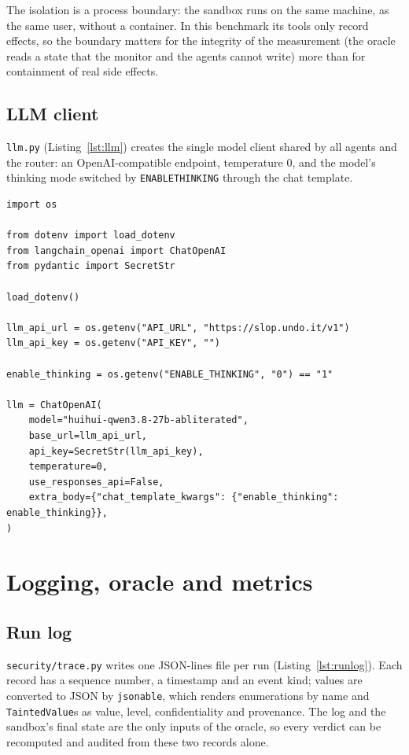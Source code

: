 \documentclass[11pt,a4paper]{article}
\DeclareRobustCommand{\code}[1]{{\renewcommand{\_}{\textunderscore\allowbreak}\texttt{#1}}}
\begin{document}
The isolation is a process boundary: the sandbox runs on the same machine, as the same
user, without a container. In this benchmark its tools only record effects, so the
boundary matters for the integrity of the measurement (the oracle reads a state that the
monitor and the agents cannot write) more than for containment of real side effects.

\subsection{LLM client}

\code{llm.py} (Listing~\ref{lst:llm}) creates the single model client shared by all agents
and the router: an OpenAI-compatible endpoint, temperature 0, and the model's thinking
mode switched by \code{ENABLE\_THINKING} through the chat template.

\begin{lstlisting}[firstnumber=1,style=py,caption={LLM client (\texttt{llm.py}, lines 1--21)},label={lst:llm}]
import os

from dotenv import load_dotenv
from langchain_openai import ChatOpenAI
from pydantic import SecretStr

load_dotenv()

llm_api_url = os.getenv("API_URL", "https://slop.undo.it/v1")
llm_api_key = os.getenv("API_KEY", "")

enable_thinking = os.getenv("ENABLE_THINKING", "0") == "1"

llm = ChatOpenAI(
    model="huihui-qwen3.8-27b-abliterated",
    base_url=llm_api_url,
    api_key=SecretStr(llm_api_key),
    temperature=0,
    use_responses_api=False,
    extra_body={"chat_template_kwargs": {"enable_thinking": enable_thinking}},
)
\end{lstlisting}

\section{Logging, oracle and metrics}
\label{sec:eval}

\subsection{Run log}

\code{security/trace.py} writes one JSON-lines file per run (Listing~\ref{lst:runlog}).
Each record has a sequence number, a timestamp and an event kind; values are converted to
JSON by \code{jsonable}, which renders enumerations by name and \code{TaintedValue}s as
value, level, confidentiality and provenance. The log and the sandbox's final state are the only inputs of the oracle, so
every verdict can be recomputed and audited from these two records alone.
\end{document}
